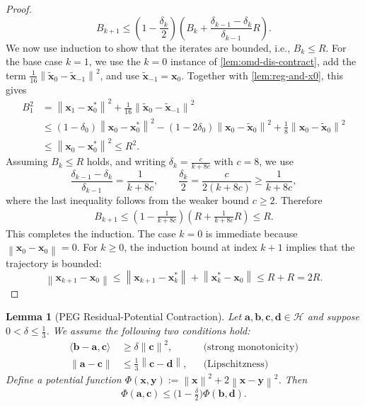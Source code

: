 \documentclass[letterpaper,11pt]{article}
\newcommand{\parenth}[1]{\left( #1 \right)}
\newcommand{\norm}[1]{\left\| #1 \right\|}
\newcommand{\vect}[1]{\mathbf{#1}}
\newtheorem{lemma}{Lemma}
\begin{document}
\begin{proof}
\begin{equation}
    B_{k+1} \le \parenth{1 - \frac{\delta_k}{2}} \parenth{B_k + \frac{\delta_{k-1} - \delta_k}{\delta_{k-1}} R}.
\end{equation}
We now use induction to show that the iterates are bounded, i.e., $B_k \le R$. For the base case $k = 1$, we use the \(k=0\) instance of \cref{lem:omd-dis-contract}, add the term \(\frac1{16}\norm{\tilde{\vect{x}}_0-\tilde{\vect{x}}_{-1}}^2\), and use \(\tilde{\vect{x}}_{-1}=\vect{x}_0\). Together with \cref{lem:reg-and-x0}, this gives
\begin{align*}
    B_1^2
    &= \norm{\vect{x}_{1} - \vect{x}_0^*}^2 + \frac{1}{16} \norm{\tilde{\vect{x}}_0 - \tilde{\vect{x}}_{-1}}^2  \\
    &\le (1 - \delta_0)\norm{\vect{x}_0 - \vect{x}_0^*}^2 - (1 - 2\delta_0) \norm{\vect{x}_0 - \tilde{\vect{x}}_0}^2 + \frac{1}{8}\norm{\vect{x}_0 - \tilde{\vect{x}}_0}^2  \\
    &\le \norm{\vect{x}_0 - \vect{x}_0^*}^2 \le R^2.
\end{align*}
Assuming $B_k \le R$ holds, and writing $\delta_k = \frac{c}{k + 8c}$ with \(c=8\), we use
\[
\frac{\delta_{k-1}-\delta_k}{\delta_{k-1}}=\frac{1}{k+8c},
\qquad
\frac{\delta_k}{2}=\frac{c}{2(k+8c)}\ge\frac{1}{k+8c},
\]
where the last inequality follows from the weaker bound \(c\ge2\). Therefore
\begin{align*}
    B_{k+1} \le \parenth{1 - \frac{1}{k + 8c}} \parenth{R + \frac{1}{k + 8c} R} \le R.
\end{align*}
This completes the induction. The case \(k=0\) is immediate because \(\norm{\vect{x}_0-\vect{x}_0}=0\). For \(k\ge0\), the induction bound at index \(k+1\) implies that the trajectory is bounded:
\begin{equation}
    \norm{\vect{x}_{k+1} - \vect{x}_0} \le \norm{\vect{x}_{k+1} - \vect{x}_k^*} + \norm{\vect{x}_k^* - \vect{x}_0} \le R+R = 2R.
\end{equation}
\end{proof}

\begin{lemma}[PEG Residual-Potential Contraction]\label{lem:peg-contraction}
Let $\vect{a},\vect{b},\vect{c},\vect{d}\in\mathcal H$ and suppose $0 < \delta \le \frac{1}{3}$. We assume the following two conditions hold:
\begin{align}
\langle \vect{b}-\vect{a}, \vect{c}\rangle &\ge \delta \norm{\vect{c}}^{2}, && \text{(strong monotonicity)}\label{eq:monotone}\\
\norm{\vect{a}-\vect{c}} &\le \frac{1}{3}\norm{\vect{c}-\vect{d}}, && \text{(Lipschitzness)}\label{eq:lipschitz}
\end{align}
Define a potential function
$\Phi(\vect{x}, \vect{y}) := \norm{\vect{x}}^{2} + 2\norm{\vect{x}-\vect{y}}^{2}$. Then
\begin{equation}
\Phi(\vect{a}, \vect{c}) \le \bigl(1 - \tfrac{\delta}{2}\bigr) \Phi(\vect{b}, \vect{d}).\label{eq:goal}
\end{equation}
\end{lemma}
\end{document}
